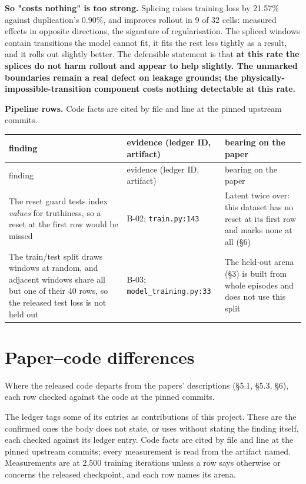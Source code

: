 \documentclass[10pt]{article}
\begin{document}
\textbf{So "costs nothing" is too strong.} Splicing raises training loss by 21.57\% against duplication's 0.90\%, and improves rollout in 9 of 32 cells: measured effects in opposite directions, the signature of regularisation. The spliced windows contain transitions the model cannot fit, it fits the rest less tightly as a result, and it rolls out slightly better. The defensible statement is that \textbf{at this rate the splices do not harm rollout and appear to help slightly. The unmarked boundaries remain a real defect on leakage grounds; the physically-impossible-transition component costs nothing detectable at this rate.}


\textbf{Pipeline rows.} Code facts are cited by file and line at the pinned upstream commits.

\begingroup\small
\begin{longtable}{>{\raggedright\arraybackslash}p{}>{\raggedright\arraybackslash}p{}>{\raggedright\arraybackslash}p{}}
\toprule finding & evidence (ledger ID, artifact) & bearing on the paper \\ \midrule\endfirsthead
\toprule finding & evidence (ledger ID, artifact) & bearing on the paper \\ \midrule\endhead
\bottomrule\endlastfoot
The reset guard tests index \emph{values} for truthiness, so a reset at the first row would be missed & B-02; \texttt{train\allowbreak{}.py:143} & Latent twice over: this dataset has no reset at its first row and marks none at all (\S{}6) \\
The train/\allowbreak{}test split draws windows at random, and adjacent windows share all but one of their 40 rows, so the released test loss is not held out & B-03; \texttt{model\_\allowbreak{}training\allowbreak{}.py:33} & The held-out arena (\S{}3) is built from whole episodes and does not use this split \\
\end{longtable}\endgroup

\section{Paper--code differences}

Where the released code departs from the papers' descriptions (\S{}5.1, \S{}5.3, \S{}6), each row checked against the code at the pinned commits.

The ledger tags some of its entries as contributions of this project. These are the confirmed ones the body does not state, or uses without stating the finding itself, each checked against its ledger entry. Code facts are cited by file and line at the pinned upstream commits; every measurement is read from the artifact named. Measurements are at 2,500 training iterations unless a row says otherwise or concerns the released checkpoint, and each row names its arena.
\end{document}

